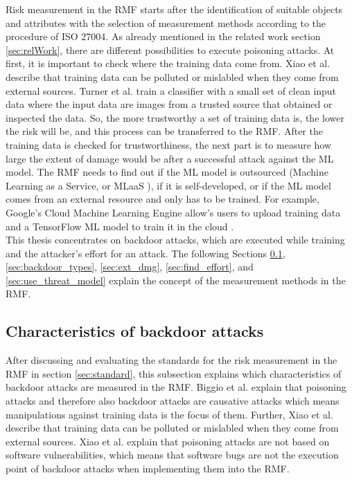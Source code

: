 Risk measurement in the RMF starts after the identification of suitable objects and attributes with the selection of measurement methods according to the procedure of ISO 27004. As already mentioned in the related work section \ref{sec:relWork}, there are different possibilities to execute poisoning attacks. At first, it is important to check where the training data come from. Xiao et al. \cite{DBLP:conf/sp/XiaoLZX18} describe that training data can be polluted or mislabled when they come from external sources. Turner et al. \cite{turner2018clean} train a classifier with a small set of clean input data where the input data are images from a trusted source that obtained or inspected the data. So, the more trustworthy a set of training data is, the lower the risk will be, and this process can be transferred to the RMF. After the training data is checked for trustworthiness, the next part is to measure how large the extent of damage would be after a successful attack against the ML model. The RMF needs to find out if the ML model is outsourced (Machine Learning as a Service, or MLaaS \cite{DBLP:journals/corr/abs-1708-06733}), if it is self-developed, or if the ML model comes from an external resource and only has to be trained. For example, Google's Cloud Machine Learning Engine \cite{google_ai2022} allow's users to upload training data and a TensorFlow ML model to train it
in the cloud \cite{DBLP:journals/corr/abs-1708-06733}. \\ This thesis concentrates on backdoor attacks, which are executed while training and the attacker's effort for an attack. The following
Sections \ref{sec:charac_backdoor}, \ref{sec:backdoor_types}, \ref{sec:ext_dmg}, \ref{sec:find_effort}, and \ref{sec:use_threat_model} explain the concept of the measurement methods in the RMF.

\subsection{Characteristics of backdoor attacks}
\label{sec:charac_backdoor}

After discussing and evaluating the standards for the risk measurement in the RMF in section \ref{sec:standard}, this subsection explains which characteristics of backdoor attacks are measured in the RMF. Biggio et al. \cite{DBLP:conf/icml/BiggioNL12} explain that poisoning attacks and therefore also backdoor attacks are causative attacks which means manipulations against training data is the focus of them. Further, Xiao et al. \cite{DBLP:conf/sp/XiaoLZX18} describe that training data can be polluted or mislabled when they come from external sources. Xiao et al. explain that poisoning attacks are not based on software vulnerabilities, which means that software bugs are not the execution point of backdoor attacks when implementing them into the RMF.

